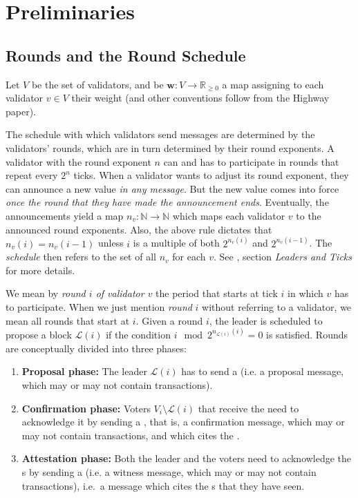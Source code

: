 \section{Preliminaries}

\subsection{Rounds and the Round Schedule}
\label{sec:schedule}

Let $V$ be the set of validators, and be $\boldsymbol{w}:V\to \mathbb{R}_{\geq 0}$ a map assigning to each validator $v\in V$ their weight (and other conventions follow from the Highway paper).

The schedule with which validators send messages are determined by the validators' rounds, which are in turn determined by their round exponents. A validator with the round exponent $n$ can and has to participate in rounds that repeat every $2^n$ ticks. When a validator wants to adjust its round exponent, they can announce a new value \emph{in any message}. But the new value comes into force \emph{once the round that they have made the announcement ends}. Eventually, the announcements yield a map $n_v: \mathbb{N}\to \mathbb{N}$ which maps each validator $v$ to the announced round exponents. Also, the above rule dictates that $n_v(i)=n_v(i-1)$ unless $i$ is a multiple of both $2^{n_v(i)}$ and $2^{n_v(i-1)}$. The \emph{schedule} then refers to the set of all $n_v$ for each $v$. See \cite{kane2019casperlabs}, section \emph{Leaders and Ticks} for more details.

We mean by \emph{round $i$ of validator $v$} the period that starts at tick $i$ in which $v$ has to participate. When we just mention \emph{round} $i$ without referring to a validator, we mean all rounds that start at $i$. Given a round $i$, the leader is scheduled to propose a block $\mathcal{L}(i)$ if the condition $i\mod 2^{n_{\mathcal{L}(i)}(i)}=0$ is satisfied. Rounds are conceptually divided into three phases:

\begin{enumerate}
\item \textbf{Proposal phase:}
  The leader $\mathcal{L}(i)$ has to send a \PROP{} (i.e. a proposal message, which may or may not contain transactions).
\item \textbf{Confirmation phase:}
  Voters $V_i\setminus \mathcal{L}(i)$ that receive the \PROP need to acknowledge it by sending a \CONF, that is, a confirmation message, which may or may not contain transactions, and which cites the \PROP.
\item \textbf{Attestation phase:}
  Both the leader and the voters need to acknowledge the \CONF{}s by sending a \WIT{} (i.e. a witness message, which may or may not contain transactions), i.e.~a message which cites the \CONF{}s that they have seen.
\end{enumerate}

